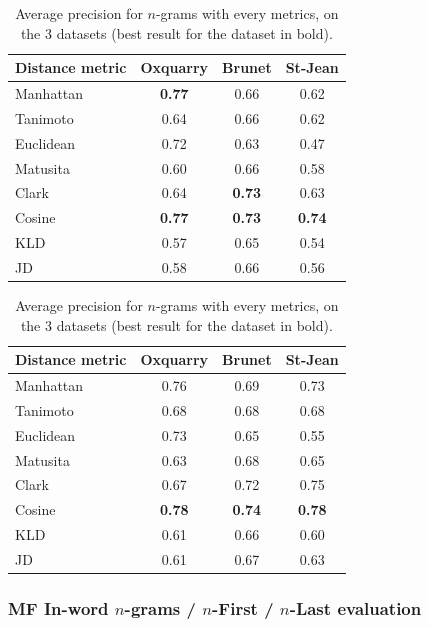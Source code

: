 \begin{table}
  \centering
  \caption{Average precision for $n$-grams with every metrics, on the 3 datasets (best result for the dataset in bold).}
  \label{tab:letter_ngrams}

  \begin{tabular}{l c c c}
    \toprule
    Distance metric & Oxquarry & Brunet & St-Jean \\
    \midrule
    Manhattan & \textbf{0.77} & 0.66 & 0.62 \\
    Tanimoto & 0.64 & 0.66 & 0.62 \\
    Euclidean & 0.72 & 0.63 & 0.47 \\
    Matusita & 0.60 & 0.66 & 0.58 \\
    Clark & 0.64 & \textbf{0.73} & 0.63 \\
    Cosine & \textbf{0.77} & \textbf{0.73} & \textbf{0.74} \\
    KLD & 0.57 & 0.65 & 0.54 \\
    JD & 0.58 & 0.66 & 0.56 \\
    \bottomrule
  \end{tabular}

  \vspace{0.5cm}

  \begin{tabular}{l c c c}
    \toprule
    Distance metric & Oxquarry & Brunet & St-Jean \\
    \midrule
    Manhattan & 0.76 & 0.69 & 0.73 \\
    Tanimoto & 0.68 & 0.68 & 0.68 \\
    Euclidean & 0.73 & 0.65 & 0.55 \\
    Matusita & 0.63 & 0.68 & 0.65 \\
    Clark & 0.67 & 0.72 & 0.75 \\
    Cosine & \textbf{0.78} & \textbf{0.74} & \textbf{0.78} \\
    KLD & 0.61 & 0.66 & 0.60 \\
    JD & 0.61 & 0.67 & 0.63 \\
    \bottomrule
  \end{tabular}
\end{table}

\subsubsection{MF In-word $n$-grams / $n$-First / $n$-Last evaluation}

